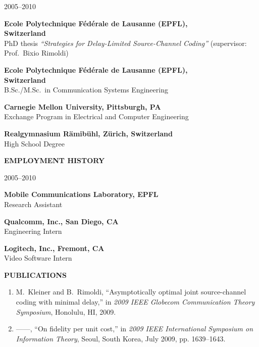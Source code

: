 {\raggedright 
\begin{cvlist}{2005--2010}
 \item[2005--2010] \textbf{Ecole Polytechnique F\'ed\'erale de Lausanne (EPFL),}\\ \textbf{Switzerland}\\
    PhD thesis \emph{``Strategies for Delay-Limited Source-Channel Coding''}
    (supervisor: Prof.~Bixio Rimoldi)
 \item[1999--2005] \textbf{Ecole Polytechnique F\'ed\'erale de Lausanne (EPFL),}\\ \textbf{Switzerland}\\
   B.Sc./M.Sc.\ in Communication Systems Engineering
  
 \item[2001--2002]  \textbf{Carnegie Mellon University, Pittsburgh, PA}\\
   Exchange Program in Electrical and Computer Engineering

 \item[1992--1999] \textbf{Realgymnasium R\"amib\"uhl, Z\"urich, Switzerland}\\
   High School Degree
 \end{cvlist}
 

\vspace{\baselineskip}
\noindent\textsf{\textbf{EMPLOYMENT HISTORY}}
\begin{cvlist}{2005--2010}
\item[2005--2010] \textbf{Mobile Communications Laboratory, EPFL}\\Research Assistant

\item[2004--2005] \textbf{Qualcomm, Inc., San Diego, CA}\\
  Engineering Intern

\item[2003] \textbf{Logitech, Inc., Fremont, CA}\\ Video Software Intern
\end{cvlist}


\noindent\textsf{\textbf{PUBLICATIONS}}
\nobreak
\begin{enumerate}
\item
M.~Kleiner and B.~Rimoldi, ``Asymptotically optimal joint source-channel coding
  with minimal delay,'' in \emph{2009 IEEE Globecom Communication Theory
  Symposium}, Honolulu, HI, 2009.

\item
------, ``On fidelity per unit cost,'' in \emph{2009 IEEE International
  Symposium on Information Theory}, Seoul, South Korea, July 2009, pp.
  1639--1643.


\end{enumerate}}
